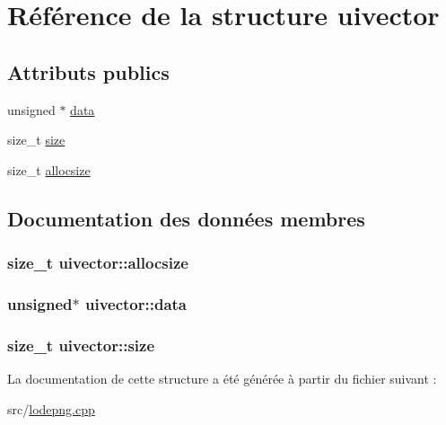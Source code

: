 \hypertarget{structuivector}{}\section{Référence de la structure uivector}
\label{structuivector}
\subsection*{Attributs publics}
\begin{DoxyCompactItemize}
\item 
unsigned $\ast$ \hyperlink{structuivector_a427d761df4bb4f0f19b4a973fc224c78}{data}
\item 
size\+\_\+t \hyperlink{structuivector_aa999025945f0c93d0461192475ae2720}{size}
\item 
size\+\_\+t \hyperlink{structuivector_aac0395a9ad397ae7a28219561ab49ffa}{allocsize}
\end{DoxyCompactItemize}


\subsection{Documentation des données membres}
\hypertarget{structuivector_aac0395a9ad397ae7a28219561ab49ffa}{}
\subsubsection[{allocsize}]{\setlength{\rightskip}{0pt plus 5cm}size\+\_\+t uivector\+::allocsize}\label{structuivector_aac0395a9ad397ae7a28219561ab49ffa}
\hypertarget{structuivector_a427d761df4bb4f0f19b4a973fc224c78}{}
\subsubsection[{data}]{\setlength{\rightskip}{0pt plus 5cm}unsigned$\ast$ uivector\+::data}\label{structuivector_a427d761df4bb4f0f19b4a973fc224c78}
\hypertarget{structuivector_aa999025945f0c93d0461192475ae2720}{}
\subsubsection[{size}]{\setlength{\rightskip}{0pt plus 5cm}size\+\_\+t uivector\+::size}\label{structuivector_aa999025945f0c93d0461192475ae2720}


La documentation de cette structure a été générée à partir du fichier suivant \+:\begin{DoxyCompactItemize}
\item 
src/\hyperlink{lodepng_8cpp}{lodepng.\+cpp}\end{DoxyCompactItemize}
